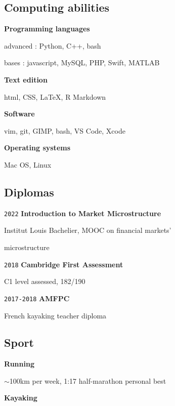 \documentclass{article}
\begin{document}
\begin{multicols}{2}
	{\color{blue} \subsection*{Computing abilities}}

		\noindent\textbf{Programming languages}

		advanced : Python, C++, bash
				
		bases : javascript, MySQL, PHP, Swift, MATLAB

\hfill

		\noindent\textbf{Text edition}

		html, CSS, \LaTeX, R Markdown

\hfill

		\noindent\textbf{Software}

		vim, git, GIMP, bash, VS Code, Xcode

\hfill

		\noindent\textbf{Operating systems}

		Mac OS, Linux

\hfill

{\color{blue} \subsection*{Diplomas}}

		\noindent\texttt{2022} \textbf{Introduction to Market Microstructure}

		Institut Louis Bachelier, MOOC on financial markets' 

		microstructure

\hfill

		\noindent\texttt{2018} \textbf{Cambridge First Assessment}

		C1 level assessed, 182/190

\hfill

		\noindent\texttt{2017-2018} \textbf{AMFPC}

		French kayaking teacher diploma

\hfill

{\color{blue} \subsection*{Sport}\label{sport}}

		\noindent\textbf{Running}

		$\sim$100km per week, 1:17 half-marathon personal best

\hfill

		\noindent\textbf{Kayaking}


\end{multicols}
\end{document}
